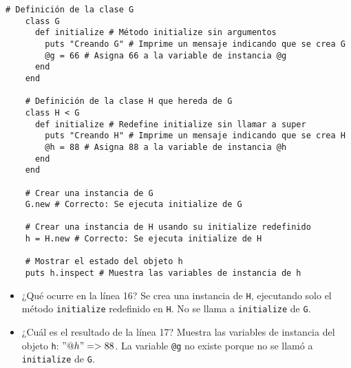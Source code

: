 \documentclass[a4paper,12pt]{article}
\begin{document}
  \begin{lstlisting}[style=customruby]
    # Definición de la clase G
    class G
      def initialize # Método initialize sin argumentos
        puts "Creando G" # Imprime un mensaje indicando que se crea G
        @g = 66 # Asigna 66 a la variable de instancia @g
      end
    end
    
    # Definición de la clase H que hereda de G
    class H < G
      def initialize # Redefine initialize sin llamar a super
        puts "Creando H" # Imprime un mensaje indicando que se crea H
        @h = 88 # Asigna 88 a la variable de instancia @h
      end
    end
    
    # Crear una instancia de G
    G.new # Correcto: Se ejecuta initialize de G
    
    # Crear una instancia de H usando su initialize redefinido
    h = H.new # Correcto: Se ejecuta initialize de H
    
    # Mostrar el estado del objeto h
    puts h.inspect # Muestra las variables de instancia de h
    \end{lstlisting}
    
    \begin{itemize}
      \item ¿Qué ocurre en la línea 16?  
            Se crea una instancia de \texttt{H}, ejecutando solo el método \texttt{initialize} redefinido en \texttt{H}. No se llama a \texttt{initialize} de \texttt{G}.
      \item ¿Cuál es el resultado de la línea 17?  
            Muestra las variables de instancia del objeto \texttt{h}: \texttt{\("@h"=>88\)}. La variable \texttt{@g} no existe porque no se llamó a \texttt{initialize} de \texttt{G}.
    \end{itemize}
    
  
  
  
\end{document}

